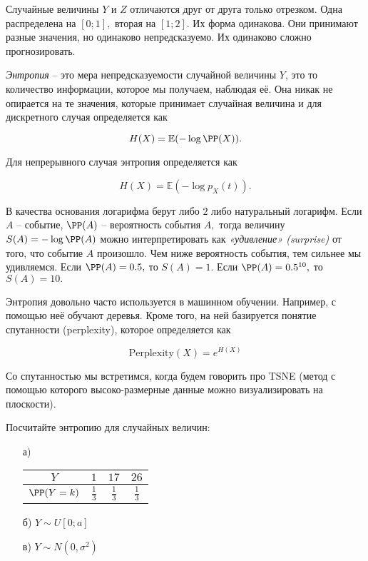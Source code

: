 \documentclass[12pt,a4paper]{article}
\begin{document}
Случайные величины $Y$ и $Z$ отличаются друг от друга только отрезком. Одна распределена на $[0;1],$ вторая на $[1;2].$ Их форма одинакова. Они принимают разные значения, но одинаково непредсказуемо. Их одинаково сложно прогнозировать. 

\emph{Энтропия} -- это мера непредсказуемости случайной величины $Y$, это то количество информации, которое мы получаем, наблюдая её.  Она никак не опирается на те значения, которые принимает случайная величина и для дискретного случая определяется  как 

\[ 
H(X) = \mathbb{E}(- \log \PP(X)). 
\]

Для непрерывного случая  энтропия определяется как 

\[ 
H(X) = \mathbb{E}(- \log p_X(t)). 
\]

В качества основания логарифма берут либо $2$ либо натуральный логарифм.  Если $A$ -- событие, $\PP(A)$ -- вероятность события $A,$ тогда величину $S(A) = -\log \PP(A)$ можно интерпретировать как \emph{«удивление» (surprise)} от того, что событие $A$ произошло. Чем ниже вероятность события, тем сильнее мы удивляемся. Если $\PP(A) = 0.5,$ то $S(A) = 1$. Если $\PP(A) = 0.5^{10},$ то $S(A) = 10.$ 

Энтропия довольно часто используется в машинном обучении. Например, с помощью неё обучают деревья.  Кроме того, на ней базируется понятие спутанности (perplexity), которое определяется как 

\[ 
\text{Perplexity}(X) = e^{H(X)}
\]

Со спутанностью мы встретимся, когда будем говорить про TSNE (метод с помощью которого высоко-размерные данные можно визуализировать на плоскости).

\begin{vkProblem}
    Посчитайте энтропию для случайных величин:
    \begin{enumerate}
        \item[а)] 
        \begin{tabular}{c|c|c|c}
            $Y$ & $1$ & $17$  &  $26$  \\ \hline
            $\PP(Y = k)$ & $\frac{1}{3}$ & $\frac{1}{3}$  & $\frac{1}{3}$ 
        \end{tabular}
        \item[б)] $Y \sim U[0;a]$
        \item[в)] $Y \sim N(0, \sigma^2)$
    \end{enumerate}
\end{vkProblem}
\end{document}
